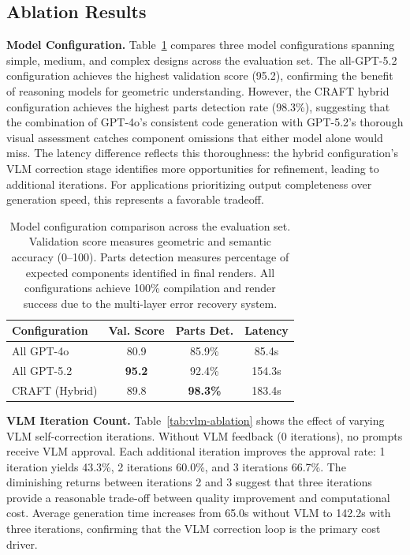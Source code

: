 \documentclass[5p,twocolumn,10pt,times]{elsarticle}
\begin{document}
\subsection{Ablation Results}
\textbf{Model Configuration.} Table~\ref{tab:model-config} compares three model configurations spanning simple, medium, and complex designs across the evaluation set. The all-GPT-5.2 configuration achieves the highest validation score (95.2), confirming the benefit of reasoning models for geometric understanding. However, the CRAFT hybrid configuration achieves the highest parts detection rate (98.3\%), suggesting that the combination of GPT-4o's consistent code generation with GPT-5.2's thorough visual assessment catches component omissions that either model alone would miss. The latency difference reflects this thoroughness: the hybrid configuration's VLM correction stage identifies more opportunities for refinement, leading to additional iterations. For applications prioritizing output completeness over generation speed, this represents a favorable tradeoff.

\begin{table}[t]
\centering
\caption{Model configuration comparison across the evaluation set. Validation score measures geometric and semantic accuracy (0--100). Parts detection measures percentage of expected components identified in final renders. All configurations achieve 100\% compilation and render success due to the multi-layer error recovery system.}
\label{tab:model-config}
\small
\begin{tabular}{lccc}
\toprule
\textbf{Configuration} & \textbf{Val. Score} & \textbf{Parts Det.} & \textbf{Latency} \\
\midrule
All GPT-4o & 80.9 & 85.9\% & 85.4s \\
All GPT-5.2 & \textbf{95.2} & 92.4\% & 154.3s \\
CRAFT (Hybrid) & 89.8 & \textbf{98.3\%} & 183.4s \\
\bottomrule
\end{tabular}
\end{table}
\textbf{VLM Iteration Count.} Table~\ref{tab:vlm-ablation} shows the effect of varying VLM self-correction iterations. Without VLM feedback (0 iterations), no prompts receive VLM approval. Each additional iteration improves the approval rate: 1 iteration yields 43.3\%, 2 iterations 60.0\%, and 3 iterations 66.7\%. The diminishing returns between iterations 2 and 3 suggest that three iterations provide a reasonable trade-off between quality improvement and computational cost. Average generation time increases from 65.0s without VLM to 142.2s with three iterations, confirming that the VLM correction loop is the primary cost driver.
\end{document}
